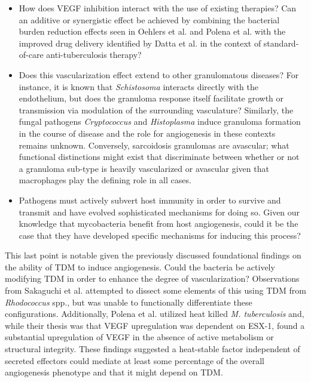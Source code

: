 \begin{itemize}
\item How does VEGF inhibition interact with the use of existing therapies? Can an additive or synergistic effect be achieved by combining the bacterial burden reduction effects seen in Oehlers et al. and Polena et al. with the improved drug delivery identified by Datta et al. in the context of standard-of-care anti-tuberculosis therapy?
\item Does this vascularization effect extend to other granulomatous diseases? For instance, it is known that \textit{Schistosoma} interacts directly with the endothelium, but does the granuloma response itself facilitate growth or transmission via modulation of the surrounding vasculature? Similarly, the fungal pathogens \textit{Cryptococcus} and \textit{Histoplasma} induce granuloma formation in the course of disease and the role for angiogenesis in these contexts remains unknown. Conversely, sarcoidosis granulomas are avascular; what functional distinctions might exist that discriminate between whether or not a granuloma sub-type is heavily vascularized or avascular given that macrophages play the defining role in all cases.
\item Pathogens must actively subvert host immunity in order to survive and transmit and have evolved sophisticated mechanisms for doing so. Given our knowledge that mycobacteria benefit from host angiogenesis, could it be the case that they have developed specific mechanisms for inducing this process? 
\end{itemize}

This last point is notable given the previously discussed foundational findings on the ability of TDM to induce angiogenesis. Could the bacteria be actively modifying TDM in order to enhance the degree of vascularization? Observations from Sakaguchi et al. attempted to dissect some elements of this using TDM from \textit{Rhodococcus} spp., but was unable to functionally differentiate these configurations. Additionally, Polena et al. utilized heat killed \textit{M. tuberculosis} and, while their thesis was that VEGF upregulation was dependent on ESX-1, found a substantial upregulation of VEGF in the absence of active metabolism or structural integrity. These findings suggested a heat-stable factor independent of secreted effectors could mediate at least some percentage of the overall angiogenesis phenotype and that it might depend on TDM.

